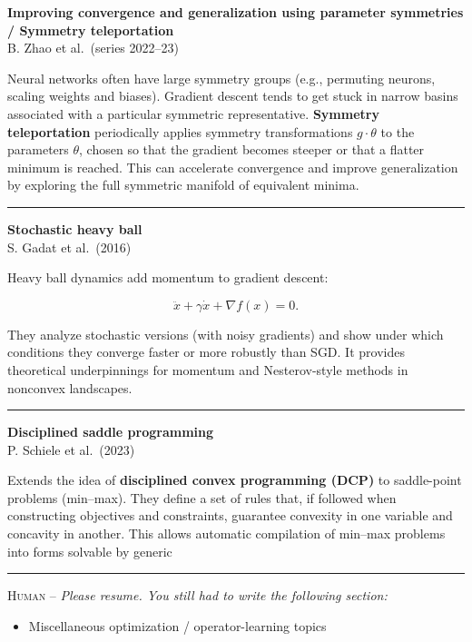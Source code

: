 \documentclass[a5paper]{article}
\providecommand{\tightlist}{%
  \setlength{\itemsep}{0pt}\setlength{\parskip}{0pt}}
\begin{document}
\textbf{Improving convergence and generalization using parameter
symmetries / Symmetry teleportation}\\
B. Zhao et al.~(series 2022--23)

Neural networks often have large symmetry groups (e.g., permuting
neurons, scaling weights and biases). Gradient descent tends to get
stuck in narrow basins associated with a particular symmetric
representative. \textbf{Symmetry teleportation} periodically applies
symmetry transformations $g\cdot\theta$ to the parameters $\theta$, chosen so that the
gradient becomes steeper or that a flatter minimum is reached. This can
accelerate convergence and improve generalization by exploring the full
symmetric manifold of equivalent minima.

\begin{center}\rule{0.5\linewidth}{0.5pt}\end{center}

\textbf{Stochastic heavy ball}\\
S. Gadat et al.~(2016)

Heavy ball dynamics add momentum to gradient descent:

\[ \ddot x + \gamma \dot x + \nabla f(x) = 0. \]

They analyze stochastic versions (with noisy gradients) and show under
which conditions they converge faster or more robustly than SGD. It
provides theoretical underpinnings for momentum and Nesterov-style
methods in nonconvex landscapes.

\begin{center}\rule{0.5\linewidth}{0.5pt}\end{center}

\textbf{Disciplined saddle programming}\\
P. Schiele et al.~(2023)

Extends the idea of \textbf{disciplined convex programming (DCP)} to
saddle-point problems (min--max). They define a set of rules that, if
followed when constructing objectives and constraints, guarantee
convexity in one variable and concavity in another. This allows
automatic compilation of min--max problems into forms solvable by
generic

\begin{center}\rule{0.5\linewidth}{0.5pt}\end{center}

\textsc{Human --}
\itshape
Please resume. You still had to write the following section:

\begin{itemize}
\tightlist
\item
  Miscellaneous optimization / operator-learning topics
\end{itemize}
\upshape
\end{document}
